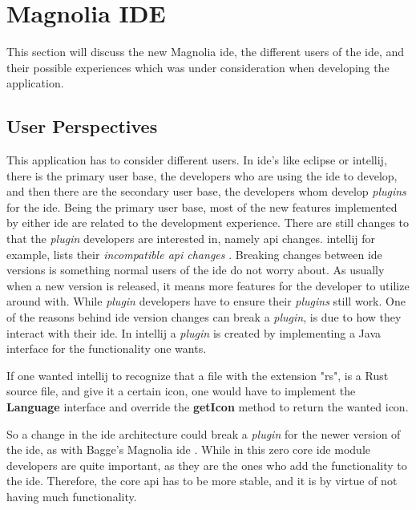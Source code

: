 \chapter{Magnolia IDE} \label{cha:ide}

This section will discuss the new Magnolia \gls{ide}, the different users of the
\gls{ide}, and their possible experiences which was under consideration when
developing the application.

\section{User Perspectives}

This application has to consider different users. In \gls{ide}'s like
\gls{eclipse} or \gls{intellij}, there is the primary user base, the developers
who are using the \gls{ide} to develop, and then there are the secondary user
base, the developers whom develop \textit{plugins} for the \gls{ide}. Being the
primary user base, most of the new features implemented by either \gls{ide} are
related to the development experience. There are still changes to that the
\textit{plugin} developers are interested in, namely \gls{api} changes.
\gls{intellij} for example, lists their \textit{incompatible \gls{api} changes}
\cite{intellijBrokenApi}. Breaking changes between \gls{ide} versions is
something normal users of the \gls{ide} do not worry about. As usually when a new
version is released, it means more features for the developer to utilize
around with. While \textit{plugin} developers have to ensure their
\textit{plugins} still work. One of the reasons behind \gls{ide} version changes
can break a \textit{plugin}, is due to how they interact with their \gls{ide}.
In \gls{intellij} a \textit{plugin} is created by implementing a Java interface
for the functionality one wants.

If one wanted \gls{intellij} to recognize that a file with the extension "rs",
is a Rust source file, and give it a certain icon, one would have to implement
the \textbf{Language} interface and override the \textbf{getIcon} method to
return the wanted icon.

So a change in the \gls{ide} architecture could break a \textit{plugin} for the
newer version of the \gls{ide}, as with Bagge's Magnolia \gls{ide}
\cite{baggeIde}. While in this zero core \gls{ide} module developers are quite
important, as they are the ones who add the functionality to the \gls{ide}.
Therefore, the core \gls{api} has to be more stable, and it is by virtue of not
having much functionality.

